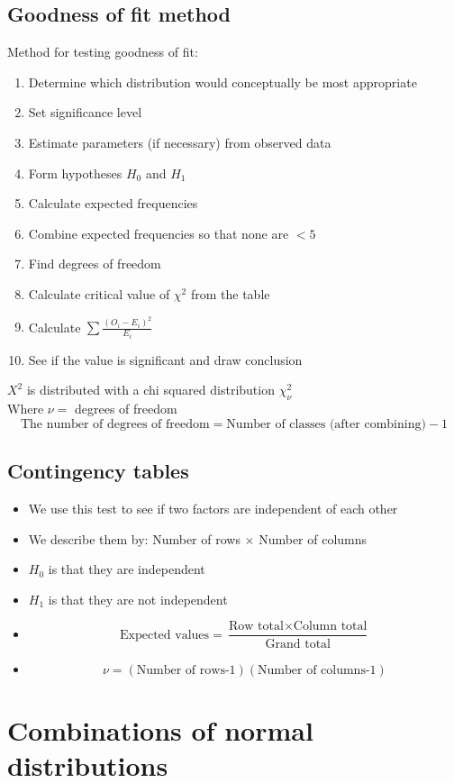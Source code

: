 \documentclass{article}[18pt]
\begin{document}
\subsection{Goodness of fit method}
Method for testing goodness of fit:
\begin{enumerate}
\item Determine which distribution would conceptually be most appropriate
\item Set significance level
\item Estimate parameters (if necessary) from observed data
\item Form hypotheses $H_0$ and $H_1$
\item Calculate expected frequencies
\item Combine expected frequencies so that none are $<5$
\item Find degrees of freedom
\item Calculate critical value of $\chi^2$ from the table
\item Calculate $\sum\frac{(O_i-E_i)^2}{E_i}$
\item See if the value is significant and draw conclusion
\end{enumerate}
$X^2$ is distributed with a chi squared distribution $\chi^2_\nu$\\
Where $\nu=$ degrees of freedom\\
$$\textrm{The number of degrees of freedom}=\textrm{Number of classes (after combining)}-1$$
\subsection{Contingency tables}
\begin{itemize}
\item We use this test to see if two factors are independent of each other
\item We describe them by: Number of rows $\times$ Number of columns
\item $H_0$ is that they are independent
\item $H_1$ is that they are not independent
\item $$\textrm{Expected values}=\frac{\textrm{Row total}\times\textrm{Column total}}{\textrm{Grand total}}$$
\item $$\nu=(\textrm{Number of rows-1})(\textrm{Number of columns-1})$$
\end{itemize}
\section{Combinations of normal distributions}
\end{document}
